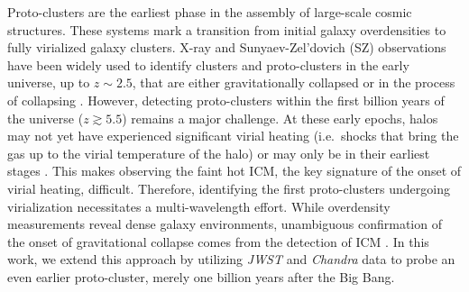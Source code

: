 \documentclass[pdflatex,sn-mathphys-num]{sn-jnl}
\theoremstyle{thmstyleone}
\theoremstyle{thmstyletwo}
\theoremstyle{thmstylethree}
\begin{document}


\maketitle

Proto-clusters are the earliest phase in the assembly of large-scale cosmic structures. These systems mark a transition from initial galaxy overdensities to fully virialized galaxy clusters. X-ray and Sunyaev-Zel'dovich (SZ) observations have been widely used to identify clusters and proto-clusters in the early universe, up to $z\sim2.5$, that are either gravitationally collapsed or in the process of collapsing \cite{2009ApJ...701...32S,2011A&A...526A.133G,2016ApJ...817..122B,2018A&A...620A...2M,2020ApJ...902..144D,2020MNRAS.496.1554M,2020ApJS..247...25B,2021ApJS..253....3H,2023Natur.615..809D}.  However, detecting proto-clusters within the first billion years of the universe ($z\gtrsim5.5$) remains a major challenge. At these early epochs, halos may not yet have experienced significant virial heating (i.e.\  shocks that bring the gas up to the virial temperature of the halo) or may only be in their earliest stages \cite{2012ARA&A..50..353K,2016A&ARv..24...14O}. This makes observing the faint hot ICM, the key signature of the onset of virial heating, difficult. Therefore, identifying the first proto-clusters undergoing virialization necessitates a multi-wavelength effort. While overdensity measurements reveal dense galaxy environments, unambiguous confirmation of the onset of gravitational collapse comes from the detection of ICM \cite{2011NJPh...13l5014F,2020A&A...642A.124T,2024A&A...691A.300X}. In this work, we extend this approach by utilizing \textit{JWST} and \textit{Chandra} data to probe an even earlier proto-cluster, merely one billion years after the Big Bang.
\end{document}
